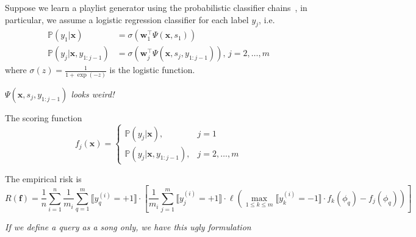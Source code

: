 \documentclass[9pt]{extarticle}
\newcommand{\llb}{\llbracket}
\newcommand{\rrb}{\rrbracket}
\newcommand{\f}{\mathbf{f}}
\newcommand{\x}{\mathbf{x}}
\newcommand{\1}{\mathbf{1}}
\newcommand{\w}{\mathbf{w}}
\newcommand{\p}{\mathbb{P}}
\newcommand{\pb}[1]{^{({#1})}}
\newcommand{\ie}{i.e.\ }
\begin{document}
Suppose we learn a playlist generator using the probabilistic classifier chains~\cite{dembczynski:2010},
in particular, we assume a logistic regression classifier for each label $y_j$, \ie
\begin{align*}
\p(y_1 |\x) &= \sigma\left( \w_1^\top \Psi(\x, s_1) \right) \\
\p(y_j |\x, y_{1:j-1}) &= \sigma\left( \w_j^\top \Psi(\x, s_j, y_{1:j-1}) \right), \, j=2,\dots,m
\end{align*}
where $\sigma(z) = \frac{1}{1+\exp(-z)}$ is the logistic function.

\emph{$\Psi(\x, s_j, y_{1:j-1})$ looks weird!}

The scoring function
$$
f_j(\x) = 
\begin{cases}
\p(y_j |\x), & j=1 \\
\p(y_j |\x, y_{1:j-1}), & j=2,\dots,m
\end{cases}
$$

The empirical risk is
$$
R(\f) 
= \frac{1}{n} \sum_{i=1}^n 
  \frac{1}{m_i} \sum_{q=1}^m \llb y_q\pb{i} = +1 \rrb 
  \cdot \left[
  \frac{1}{m_i} \sum_{j=1}^m 
  \llb y_j\pb{i} = +1 \rrb \cdot \ell \left( \max_{1 \le k \le m} \llb y_k\pb{i} = -1 \rrb \cdot f_k(\phi_q) - f_j(\phi_q) 
  \right) \right]
$$

\emph{If we define a query as a song only, we have this ugly formulation} 
\end{document}
